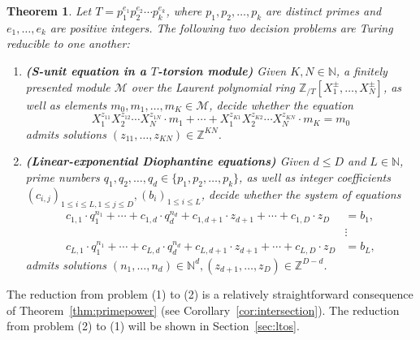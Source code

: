 \documentclass[letterpaper, 11pt, thm-restate]{article}
\numberwithin{equation}{section}
\newcommand{\Z}{\mathbb{Z}}
\newcommand{\N}{\mathbb{N}}
\newcommand{\ZT}{\mathbb{Z}_{/T}}
\newcommand{\mM}{\mathcal{M}}
\newtheorem{thrm}{Theorem}[section]
\theoremstyle{definition}
\theoremstyle{definition}
\theoremstyle{definition}
\begin{document}
\begin{thrm}\label{thm:mainequiv}
    Let $T = p_1^{e_1} p_2^{e_2} \cdots p_k^{e_k}$, where $p_1, p_2, \ldots, p_k$ are distinct primes and $e_1, \ldots, e_k$ are positive integers. The following two decision problems are Turing reducible to one another:
    \begin{enumerate}[noitemsep, label = (\arabic*)]
        \item \textbf{(S-unit equation in a $T$-torsion module)} Given $K, N \in \N$, a finitely presented module $\mM$ over the Laurent polynomial ring $\ZT[X_1^{\pm}, \ldots, X_N^{\pm}]$, as well as elements $m_0, m_1, \ldots, m_K \in \mM$, decide whether the equation
        \begin{equation}\label{eq:Sunit}
        X_1^{z_{11}} X_2^{z_{12}} \cdots X_N^{z_{1N}} \cdot m_1 + \cdots + X_1^{z_{K1}} X_2^{z_{K2}} \cdots X_N^{z_{KN}} \cdot m_K = m_0
        \end{equation}
        admits solutions $(z_{11}, \ldots, z_{KN}) \in \Z^{KN}$.
        \item \textbf{(Linear-exponential Diophantine equations)} Given $d \leq D$ and $L \in \N$, prime numbers $q_1, q_2, \ldots, q_d \in \{p_1, p_2, \ldots, p_k\}$, as well as integer coefficients $(c_{i,j})_{1 \leq i \leq L, 1 \leq j \leq D}, (b_{i})_{1 \leq i \leq L}$, decide whether the system of equations
        \begin{align}\label{eq:linearpower}
            c_{1,1} \cdot q_1^{n_1} + \cdots + c_{1,d} \cdot q_d^{n_d} + c_{1,d+1} \cdot z_{d+1} + \cdots + c_{1, D} \cdot z_{D} & = b_1, \nonumber \\
            & \vdots \nonumber \\
            c_{L,1} \cdot q_1^{n_1} + \cdots + c_{L,d} \cdot q_d^{n_d} + c_{L,d+1} \cdot z_{d+1} + \cdots + c_{L, D} \cdot z_{D} & = b_L,
        \end{align}
        admits solutions $(n_1, \ldots, n_d) \in \N^d, (z_{d+1}, \ldots, z_D) \in \Z^{D-d}$.
    \end{enumerate}
\end{thrm}

The reduction from problem (1) to (2) is a relatively straightforward consequence of Theorem~\ref{thm:primepower} (see Corollary~\ref{cor:intersection}).
The reduction from problem (2) to (1) will be shown in Section~\ref{sec:ltos}.
\end{document}
